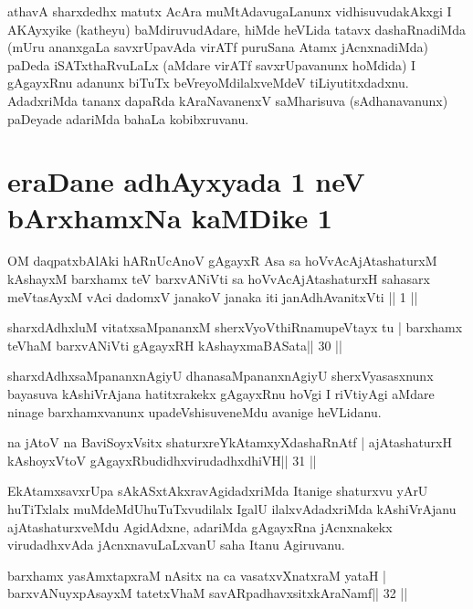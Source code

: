 \begin{artha}
athavA sharxdedhx matutx AcAra muMtAdavugaLanunx vidhisuvudakAkxgi I AKAyxyike (katheyu) baMdiruvudAdare, hiMde heVLida tatavx dashaRnadiMda (mUru ananxgaLa savxrUpavAda virATf puruSana Atamx jAcnxnadiMda) paDeda iSATxthaRvuLaLx (aMdare virATf savxrUpavanunx hoMdida) I gAgayxRnu adanunx biTuTx beVreyoMdilalxveMdeV tiLiyutitxdadxnu. AdadxriMda tananx dapaRda kAraNavanenxV saMharisuva (sAdhanavanunx) paDeyade adariMda bahaLa kobibxruvanu.
\end{artha}

\section*{eraDane adhAyxyada 1 neV bArxhamxNa kaMDike 1}

\begin{shl}
OM daqpatxbAlAki hARnUcAnoV gAgayxR Asa
sa hoVvAcAjAtashaturxM kAshayxM barxhamx teV barxvANiVti
sa hoVvAcAjAtashaturxH sahasarx meVtasAyxM vAci
dadomxV janakoV janaka iti janAdhAvanitxVti || 1 ||
\end{shl}

\begin{shl}
sharxdAdhxluM vitatxsaMpananxM sherxVyoVthiRnamupeVtayx tu |
barxhamx teV\s haM barxvANiVti gAgayxRH kAshayxmaBASata\hfill || 30 ||
\end{shl}

\begin{artha}
sharxdAdhxsaMpananxnAgiyU dhanasaMpananxnAgiyU sherxVyasasxnunx bayasuva kAshiV\-rAjana hatitxrakekx gAgayxRnu hoVgi I riVtiyAgi aMdare ninage barxhamxvanunx upadeVshisuveneMdu avanige heVLidanu.
\end{artha}


\begin{shl}
na jAtoV na BaviSoyxV\s sitx shaturxreYkAtamxyXdashaRnAtf |
ajAtashaturxH kAshoyxV\s toV gAgayxRbudidhxvirudadhxdhiVH\hfill || 31 ||
\end{shl}

\begin{artha}
EkAtamxsavxrUpa sAkASxtAkxravAgidadxriMda Itanige shaturxvu yArU huTiTxlalx \break muMdeMdUhuTuTxvudilalx IgalU ilalxvAdadxriMda kAshiVrAjanu ajAtashaturxveMdu AgidAdxne, adariMda gAgayxRna jAcnxnakekx virudadhxvAda jAcnxnavuLaLxvanU saha Itanu Agiruvanu.
\end{artha}

\begin{shl}
barxhamx yasAmxtapxraM nAsitx na ca vasatxvXnatxraM yataH |
barxvANuyxpAsayxM tatetxV\s haM savARpadhavxsitxkAraNamf\hfill || 32 ||
\end{shl}

